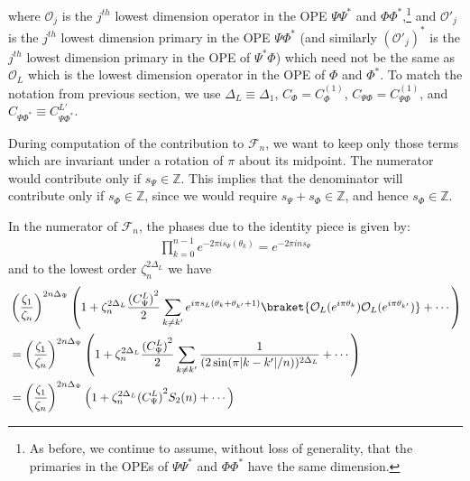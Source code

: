 \documentclass[11pt]{article}
\newcommand{\mO}{\mathcal{O}}
\newcommand{\nn}{\nonumber}
\newcommand{\lb}{\left(}
\newcommand{\rb}{\right)}
\begin{document}
  where $\mO_j$ is the $j^{th}$ lowest dimension operator in the OPE $\Psi\Psi^*$ and  $\Phi\Phi^*$,\footnote{As before, we continue to assume, without loss of generality, that the primaries in the OPEs of $\Psi \Psi^*$ and $\Phi \Phi^*$ have the same dimension.} and $\mO'_j$ is the $j^{th}$ lowest dimension primary in the OPE $\Psi\Phi^*$ (and similarly $(\mO'_j)^*$ is the $j^{th}$ lowest dimension primary in the OPE of $\Psi^*\Phi$) which need not be the same as $\mO_L$ which is the lowest dimension operator in the OPE of $\Phi$ and $\Phi^*$. 
  To match the notation from previous section, we use 
  $\Delta_L\equiv \Delta_1$, $C_\Phi=C_\Phi^{(1)}$, $C_{\Psi\Phi}=C^{(1)}_{\Psi\Phi}$, and 
  $C_{\Psi \Phi^*}\equiv C_{\Psi\Phi^*}^{L'}$.

During computation of the contribution to $\mathcal{F}_n$, we want to keep only those terms which are invariant under a rotation of $\pi$ about its midpoint. The numerator would contribute only if $s_\Psi \in \mathbb{Z}$. This implies that the denominator will contribute only if $s_\Phi \in \mathbb{Z}$, since we would require $s_\Psi + s_\Phi \in \mathbb{Z}$, and hence $s_\Phi \in \mathbb{Z}$.


In the numerator of $\mathcal{F}_n$, the phases due to the identity piece is given by:
\begin{align}
  \prod_{k=0}^{n-1}e^{-2\pi i s_\Psi(\theta_k)}=e^{-2\pi i ns_\Psi}
\end{align}
and to the lowest order $\zeta_n^{2\Delta_L}$ we have 
\begin{align}
  &\lb \frac{\zeta_1}{\zeta_n}\rb^{2n\Delta_\Psi}\lb 1+\zeta_n^{2\Delta_L}\frac{{(C_\Psi^L)}^2 }{2}\sum_{k\neq k'}e^{i\pi s_L(\theta_k+\theta_{k'}+1)}\braket{\mO_L(e^{i\pi\theta_k})\mO_L(e^{i\pi\theta_{k'}})}+\cdots \rb\nn\\
  &=\lb \frac{\zeta_1}{\zeta_n}\rb^{2n{\Delta_\Psi}}\lb 1+\zeta_n^{2\Delta_L}\frac{{(C_\Psi^L)}^2 }{2}\sum_{k\neq k'}\frac{1}{(2\sin(\pi|k-k'|/n))^{2\Delta_L}}+\cdots \rb\nn\\
  &=\lb \frac{\zeta_1}{\zeta_n}\rb^{2n{\Delta_\Psi}}\lb 1+\zeta_n^{2\Delta_L}{(C_\Psi^L)}^2 S_2(n)+\cdots \rb
\end{align}
\end{document}
